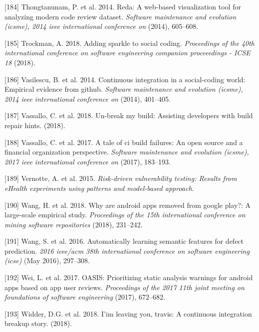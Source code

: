 \documentclass[]{book}
\begin{document}
\hypertarget{ref-thongtanunam2014reda}{}
{[}184{]} Thongtanunam, P. et al. 2014. Reda: A web-based visualization
tool for analyzing modern code review dataset. \emph{Software
maintenance and evolution (icsme), 2014 ieee international conference
on} (2014), 605--608.

\hypertarget{ref-Trockman2018}{}
{[}185{]} Trockman, A. 2018. Adding sparkle to social coding.
\emph{Proceedings of the 40th international conference on software
engineering companion proceeedings - ICSE 18} (2018).

\hypertarget{ref-vasilescu2014continuous}{}
{[}186{]} Vasilescu, B. et al. 2014. Continuous integration in a
social-coding world: Empirical evidence from github. \emph{Software
maintenance and evolution (icsme), 2014 ieee international conference
on} (2014), 401--405.

\hypertarget{ref-vassallo2018break}{}
{[}187{]} Vassallo, C. et al. 2018. Un-break my build: Assisting
developers with build repair hints. (2018).

\hypertarget{ref-vassallo2017tale}{}
{[}188{]} Vassallo, C. et al. 2017. A tale of ci build failures: An open
source and a financial organization perspective. \emph{Software
maintenance and evolution (icsme), 2017 ieee international conference
on} (2017), 183--193.

\hypertarget{ref-vernotte2015}{}
{[}189{]} Vernotte, A. et al. 2015. \emph{Risk-driven vulnerability
testing: Results from eHealth experiments using patterns and model-based
approach}.

\hypertarget{ref-wang2018android}{}
{[}190{]} Wang, H. et al. 2018. Why are android apps removed from google
play?: A large-scale empirical study. \emph{Proceedings of the 15th
international conference on mining software repositories} (2018),
231--242.

\hypertarget{ref-wang2016}{}
{[}191{]} Wang, S. et al. 2016. Automatically learning semantic features
for defect prediction. \emph{2016 ieee/acm 38th international conference
on software engineering (icse)} (May 2016), 297--308.

\hypertarget{ref-wei2017oasis}{}
{[}192{]} Wei, L. et al. 2017. OASIS: Prioritizing static analysis
warnings for android apps based on app user reviews. \emph{Proceedings
of the 2017 11th joint meeting on foundations of software engineering}
(2017), 672--682.

\hypertarget{ref-widder2018m}{}
{[}193{]} Widder, D.G. et al. 2018. I'im leaving you, travis: A
continuous integration breakup story. (2018).
\end{document}
